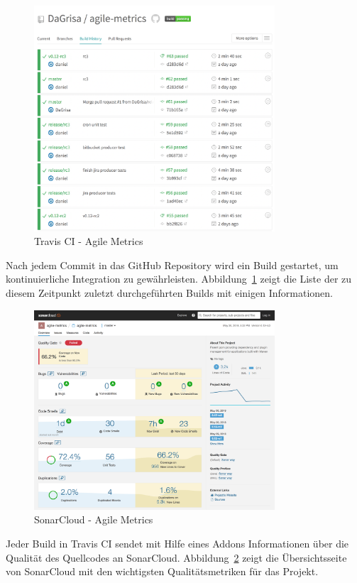 \begin{savenotes}
    \begin{figure}[H] 
        \centering
            \includegraphics[width=0.8\textwidth]{img/travisci.png}
        \caption{Travis CI - Agile Metrics}\label{fig:travisci}
    \end{figure}
\end{savenotes}

Nach jedem Commit in das GitHub Repository wird ein Build gestartet, um kontinuierliche Integration zu gewährleisten.
Abbildung~\ref{fig:travisci} zeigt die Liste der zu diesem Zeitpunkt zuletzt durchgeführten Builds mit einigen Informationen.

\begin{savenotes}
    \begin{figure}[H] 
        \centering
            \includegraphics[width=0.8\textwidth]{img/sonarcloud.png}
        \caption{SonarCloud - Agile Metrics}\label{fig:sonarcloud}
    \end{figure}
\end{savenotes}

Jeder Build in Travis CI sendet mit Hilfe eines Addons Informationen über die Qualität des Quellcodes an SonarCloud.
Abbildung~\ref{fig:sonarcloud} zeigt die Übersichtsseite von SonarCloud mit den wichtigsten Qualitätsmetriken für das Projekt.
